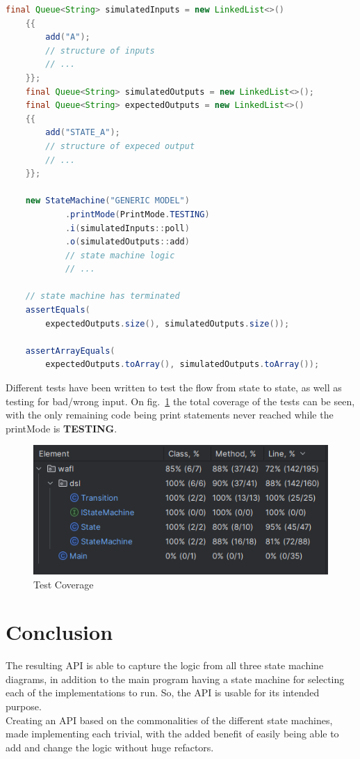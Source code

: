 \documentclass{article}
\begin{document}
\begin{lstlisting}[language=java, caption={Input and Output Test Setup}, captionpos=b,]
    final Queue<String> simulatedInputs = new LinkedList<>()
    {{
        add("A");
        // structure of inputs
        // ...
    }};
    final Queue<String> simulatedOutputs = new LinkedList<>();
    final Queue<String> expectedOutputs = new LinkedList<>()
    {{
        add("STATE_A");
        // structure of expeced output
        // ...
    }};

    new StateMachine("GENERIC MODEL")
            .printMode(PrintMode.TESTING)
            .i(simulatedInputs::poll)
            .o(simulatedOutputs::add)
            // state machine logic
            // ...

    // state machine has terminated
    assertEquals(
        expectedOutputs.size(), simulatedOutputs.size());

    assertArrayEquals(
        expectedOutputs.toArray(), simulatedOutputs.toArray());       
\end{lstlisting}

Different tests have been written to test the flow from state to state, as well as testing for bad/wrong input. On fig.~\ref{fig:test_cov} the total coverage of the tests can be seen, with the only remaining code being print statements never reached while the printMode is \textbf{TESTING}.

\begin{figure}[H]
    \centering
    \includegraphics{figures/tests.PNG}
    \caption{Test Coverage}
    \label{fig:test_cov}
\end{figure}

\section{Conclusion}

The resulting API is able to capture the logic from all three state machine diagrams, in addition to the main program having a state machine for selecting each of the implementations to run. So, the API is usable for its intended purpose.\\
Creating an API based on the commonalities of the different state machines, made implementing each trivial, with the added benefit of easily being able to add and change the logic without huge refactors.
\end{document}
